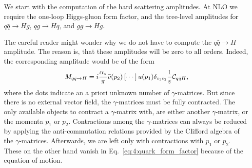 We start with the computation of the hard scattering amplitudes. At \acs{NLO} we require the one-loop Higgs-gluon form factor, and the tree-level amplitudes for $q \bar{q} \rightarrow H g$, $q g \rightarrow H q$, and $g g \rightarrow H g$.

The careful reader might wonder why we do not have to compute the $q \bar{q} \rightarrow H$ amplitude. The reason is, that these amplitudes will be zero to all orders. Indeed, the corresponding amplitude would be of the form
\begin{equation}
M_{q \bar{q} \rightarrow H} = i \frac{\alpha_s}{\pi} \bar{v}(p_2) \left[ \cdots \right] u(p_1) \delta_{c_1 c_2} \frac{1}{v} \mathcal{C}_{q \bar{q} H},
\label{eq:4:quark_form_factor}
\end{equation}
where the dots indicate an a priori unknown number of $\gamma$-matrices. But since there is no external vector field, the $\gamma$-matrices must be fully contracted. The only available objects to contract a $\gamma$-matrix with, are either another $\gamma$-matrix, or the momenta $p_1$ or $p_2$. Contractions among the $\gamma$-matrices can always be reduced by applying the anti-commutation relations provided by the Clifford algebra of the $\gamma$-matrices. Afterwards, we are left only with contractions with $p_1$ or $p_2$. These on the other hand vanish in Eq.~\eqref{eq:4:quark_form_factor} because of the equation of motion.

